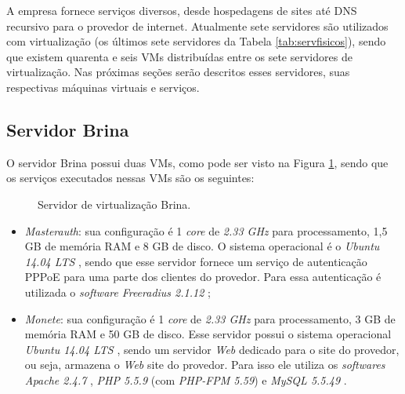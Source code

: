 A empresa fornece serviços diversos, desde hospedagens de sites até \ac{DNS} recursivo para o provedor de internet. Atualmente sete servidores 
são utilizados com virtualização (os últimos sete servidores da Tabela \ref{tab:servfisicos}), sendo que existem quarenta e seis \ac{VM}s 
distribuídas entre os sete servidores de virtualização. Nas próximas seções serão descritos esses servidores, suas respectivas máquinas virtuais 
e serviços.

\subsection{Servidor Brina}
\label{section:serv_brina}

O servidor Brina possui duas \ac{VM}s, como pode ser visto na Figura \ref{fig:servidor_brina}, sendo que os serviços executados nessas \ac{VM}s
são os seguintes:

\begin{figure}[h!]
 \centering
 \caption{Servidor de virtualização Brina.}
 \label{fig:servidor_brina}
\end{figure}

\begin{itemize}
 \item \textit{Masterauth}: sua configuração é 1 \textit{core} de \textit{2.33 GHz} para processamento, 1,5 GB de memória RAM e 8 GB de disco. 
 O sistema operacional é o \textit{Ubuntu 14.04 \ac{LTS}} \cite{ubuntu}, sendo que esse servidor fornece um serviço de autenticação \ac{PPPoE} para 
 uma parte dos clientes do provedor. Para essa autenticação é utilizada o \textit{software} \textit{Freeradius 2.1.12} \cite{freeradius};
 
 \item \textit{Monete}: sua configuração é 1 \textit{core} de \textit{2.33 GHz} para processamento, 3 GB de memória RAM e 50 GB de disco. 
 Esse servidor possui o sistema operacional \textit{Ubuntu 14.04 \ac{LTS}} \cite{ubuntu}, sendo um servidor \textit{Web} dedicado para o site do 
 provedor, ou seja, armazena o \textit{Web} site do provedor. Para isso ele utiliza os \textit{softwares} \textit{Apache 2.4.7} \cite{apache}, 
 \textit{\ac{PHP} 5.5.9} \cite{php} (com \textit{PHP-FPM 5.59}) e \textit{MySQL 5.5.49} \cite{mysql}.
\end{itemize}

